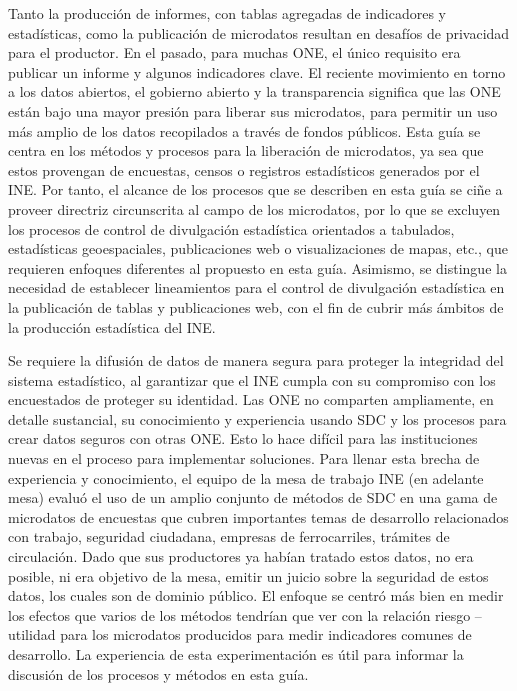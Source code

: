 \documentclass[]{book}
\theoremstyle{definition}
\theoremstyle{definition}
\theoremstyle{definition}
\theoremstyle{definition}
\theoremstyle{remark}
\begin{document}
Tanto la producción de informes, con tablas agregadas de indicadores y estadísticas, como la publicación de microdatos resultan en desafíos de privacidad para el productor. En el pasado, para muchas ONE, el único requisito era publicar un informe y algunos indicadores clave. El reciente movimiento en torno a los datos abiertos, el gobierno abierto y la transparencia significa que las ONE están bajo una mayor presión para liberar sus microdatos, para permitir un uso más amplio de los datos recopilados a través de fondos públicos. Esta guía se centra en los métodos y procesos para la liberación de microdatos, ya sea que estos provengan de encuestas, censos o registros estadísticos generados por el INE. Por tanto, el alcance de los procesos que se describen en esta guía se ciñe a proveer directriz circunscrita al campo de los microdatos, por lo que se excluyen los procesos de control de divulgación estadística orientados a tabulados, estadísticas geoespaciales, publicaciones web o visualizaciones de mapas, etc., que requieren enfoques diferentes al propuesto en esta guía. Asimismo, se distingue la necesidad de establecer lineamientos para el control de divulgación estadística en la publicación de tablas y publicaciones web, con el fin de cubrir más ámbitos de la producción estadística del INE.

Se requiere la difusión de datos de manera segura para proteger la integridad del sistema estadístico, al garantizar que el INE cumpla con su compromiso con los encuestados de proteger su identidad. Las ONE no comparten ampliamente, en detalle sustancial, su conocimiento y experiencia usando SDC y los procesos para crear datos seguros con otras ONE. Esto lo hace difícil para las instituciones nuevas en el proceso para implementar soluciones. Para llenar esta brecha de experiencia y conocimiento, el equipo de la mesa de trabajo INE (en adelante mesa) evaluó el uso de un amplio conjunto de métodos de SDC en una gama de microdatos de encuestas que cubren importantes temas de desarrollo relacionados con trabajo, seguridad ciudadana, empresas de ferrocarriles, trámites de circulación. Dado que sus productores ya habían tratado estos datos, no era posible, ni era objetivo de la mesa, emitir un juicio sobre la seguridad de estos datos, los cuales son de dominio público. El enfoque se centró más bien en medir los efectos que varios de los métodos tendrían que ver con la relación riesgo -- utilidad para los microdatos producidos para medir indicadores comunes de desarrollo. La experiencia de esta experimentación es útil para informar la discusión de los procesos y métodos en esta guía.
\end{document}
